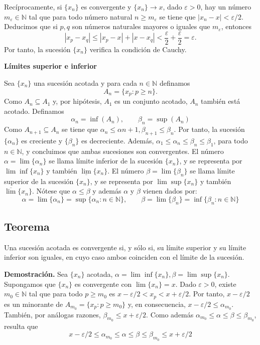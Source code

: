 \documentclass[10pt,a4paper]{article}
\begin{document}
	Recíprocamente, si $\{x_n\}$ es convergente y $\{x_n\} \rightarrow x$, dado $\varepsilon > 0$, hay un número $m_\varepsilon \in \mathbb{N}$ tal que para todo número natural $n \geq m_\varepsilon$ se tiene que $|x_n - x| < \varepsilon/2$. Deducimos que si $p, q$ son números naturales mayores o iguales que $m_\varepsilon$, entonces 
	$$|x_p -x_q| \leq |x_p - x| + |x - x_q| < \dfrac{\varepsilon}{2} + \dfrac{\varepsilon}{2} = \varepsilon.$$
	Por tanto, la sucesión $\{x_n\}$ verifica la condición de Cauchy.
	
	\vspace{0.3 cm}
	
	\textbf{\Large{Límites superior e inferior}}
	
	Sea $\{x_n\}$ una sucesión acotada y para cada $n \in \mathbb{N}$ definamos 
	$$A_n = \{x_p : p \geq n\}.$$
	Como $A_n \subseteq A_1$ y, por hipótesis, $A_1$ es un conjunto acotado, $A_n$ también está acotado. Definamos $$\alpha_n = \inf(A_n), \qquad \beta_n = \sup(A_n)$$
	Como $A_{n+1} \subseteq A_n$ se tiene que $\alpha_n \leq \alpha{n+1}, \beta_{n+1} \leq \beta_n$. Por tanto, la sucesión $\{\alpha_n\}$ es creciente y $\{\beta_n\}$ es decreciente. Además, $\alpha_1 \leq \alpha_n \leq \beta_n \leq \beta_1$, para todo $n \in \mathbb{N}$, y concluimos que ambas sucesiones son convergentes. El número $\alpha = \lim\{\alpha_n\}$ se llama límite inferior de la sucesión $\{x_n\}$, y se representa por $\lim \inf \{x_n\}$ y también $\underline{\lim}\{x_n\}$. El número $\beta = \lim\{\beta_n\}$ se llama límite superior de la sucesión $\{x_n\}$, y se representa por $\lim \sup \{x_n\}$ y también $\overline{\lim}\{x_n\}$. Nótese que $\alpha \leq \beta$ y además $\alpha$ y $\beta$ vienen dados por:
	$$\alpha = \lim\{\alpha_n\} = \sup\{\alpha_n : n \in \mathbb{N}\}, \qquad \beta = \lim\{\beta_n\} = \inf\{\beta_n : n \in \mathbb{N}\}$$
	
	\subsection{Teorema}
	Una sucesión acotada es convergente si, y sólo si, su límite superior y su límite inferior son iguales, en cuyo caso ambos coinciden con el límite de la sucesión.
	
	\textbf{Demostración. }Sea $\{x_n\}$ acotada, $\alpha = \lim \inf\{x_n\}, \beta = \lim \sup\{x_n\}$. Supongamos que $\{x_n\}$ es convergente con $\lim\{x_n\} = x$. Dado $\varepsilon > 0$, existe $m_0 \in \mathbb{N}$ tal que para todo $p \geq m_0$ es $x - \varepsilon/2 < x_p < x + \varepsilon/2$. Por tanto, $x-\varepsilon/2$ es un minorante de $A_{m_0} = \{x_p : p \geq m_0\}$ y, en consecuencia, $x-\varepsilon/2 \leq \alpha_{m_0}$. También, por análogas razones, $\beta_{m_0} \leq x + \varepsilon/2$. Como además $\alpha_{m_0} \leq \alpha \leq \beta \leq \beta_{m_0}$, resulta que 
	\begin{equation}
		x - \varepsilon/2 \leq \alpha_{m_0} \leq \alpha \leq \beta \leq \beta_{m_0} \leq x + \varepsilon/2
	\end{equation}
\end{document}

